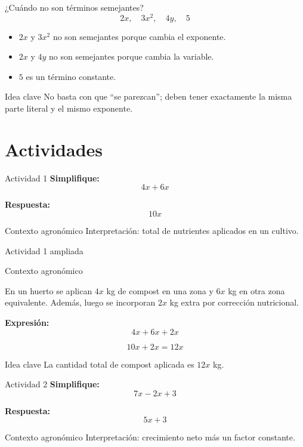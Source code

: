 \documentclass[aspectratio=169,12pt]{beamer}
\newcommand{\IdeaClave}[1]{
	\begin{alertblock}{Idea clave}
		#1
	\end{alertblock}
}
\newcommand{\Agronomia}[1]{
	\begin{exampleblock}{Contexto agronómico}
		#1
	\end{exampleblock}
}
\begin{document}
	\begin{frame}{¿Cuándo no son términos semejantes?}
		\[
		2x,\quad 3x^2,\quad 4y,\quad 5
		\]
		
		\pause
		\begin{itemize}
			\item \(2x\) y \(3x^2\) no son semejantes porque cambia el exponente.
			\pause
			\item \(2x\) y \(4y\) no son semejantes porque cambia la variable.
			\pause
			\item \(5\) es un término constante.
		\end{itemize}
		
		\pause
		\IdeaClave{No basta con que “se parezcan”; deben tener exactamente la misma parte literal y el mismo exponente.}
	\end{frame}
	
	\section{Actividades}
	\begin{frame}{Actividad 1}
		\textbf{Simplifique:}
		\[
		4x+6x
		\]
		
		\pause
		\textbf{Respuesta:}
		\[
		10x
		\]
		
		\pause
		\Agronomia{Interpretación: total de nutrientes aplicados en un cultivo.}
	\end{frame}
	
	\begin{frame}{Actividad 1 ampliada}
		\Agronomia{
			En un huerto se aplican \(4x\) kg de compost en una zona y \(6x\) kg en otra zona equivalente. Además, luego se incorporan \(2x\) kg extra por corrección nutricional.
		}
		
		\pause
		\textbf{Expresión:}
		\[
		4x+6x+2x
		\]
		
		\pause
		\[
		10x+2x=12x
		\]
		
		\pause
		\IdeaClave{La cantidad total de compost aplicada es \(12x\) kg.}
	\end{frame}
	
	\begin{frame}{Actividad 2}
		\textbf{Simplifique:}
		\[
		7x-2x+3
		\]
		
		\pause
		\textbf{Respuesta:}
		\[
		5x+3
		\]
		
		\pause
		\Agronomia{Interpretación: crecimiento neto más un factor constante.}
	\end{frame}
	
\end{document}
